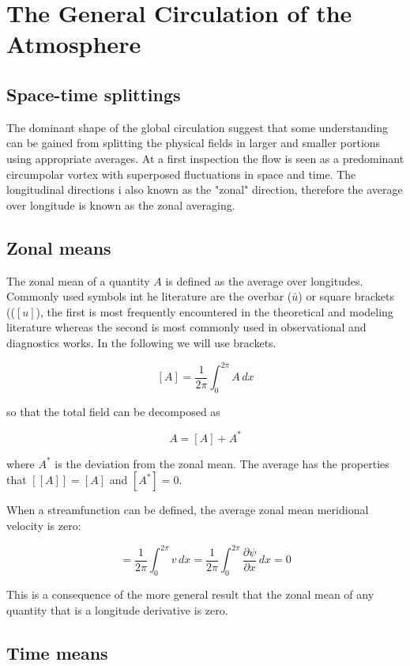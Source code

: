 \section{The General Circulation of the
Atmosphere}\label{chp:GeneralCirculation}

\subsection{Space-time splittings}\label{space-time-splittings}

The dominant shape of the global circulation suggest that some
understanding can be gained from splitting the physical fields in larger
and smaller portions using appropriate averages. At a first inspection
the flow is seen as a predominant circumpolar vortex with superposed
fluctuations in space and time. The longitudinal directions i also known
as the "zonal" direction, therefore the average over longitude is known
as the zonal averaging.

\subsection{Zonal means}\label{zonal-means}

The zonal mean of a quantity \(A\) is defined as the average over
longitudes. Commonly used symbols int he literature are the overbar
(\(\bar{u}\)) or square brackets ((\([u]\)), the first is most
frequently encountered in the theoretical and modeling literature
whereas the second is most commonly used in observational and
diagnostics works. In the following we will use brackets.

\[[A] = \frac{1}{2\pi}\int_0^{2\pi} A \, dx\]

so that the total field can be decomposed as

\[A = [A] + A^*\]

where \(A^*\) is the deviation from the zonal mean. The average has the
properties that \([[A]] = [A]\) and \([A^*]=0\).

When a streamfunction can be defined, the average zonal mean meridional
velocity is zero:

\[= \frac{1}{2\pi}\int_0^{2\pi} v \, dx=\frac{1}{2\pi}\int_0^{2\pi} \frac{\partial \psi}{\partial x} \, dx=0\]

This is a consequence of the more general result that the zonal mean of
any quantity that is a longitude derivative is zero.

\subsection{Time means}\label{time-means}

